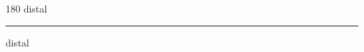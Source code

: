 
\begin{frame}
\begin{center}
\begin{turn}{180}
{\fontsize{2.5cm}{1em}\selectfont distal}
\end{turn}
\vspace{1em}\par  
\hrule
\vspace{1em}\par  
{\fontsize{2.5cm}{1em}\selectfont distal}
\end{center}
\end{frame}
